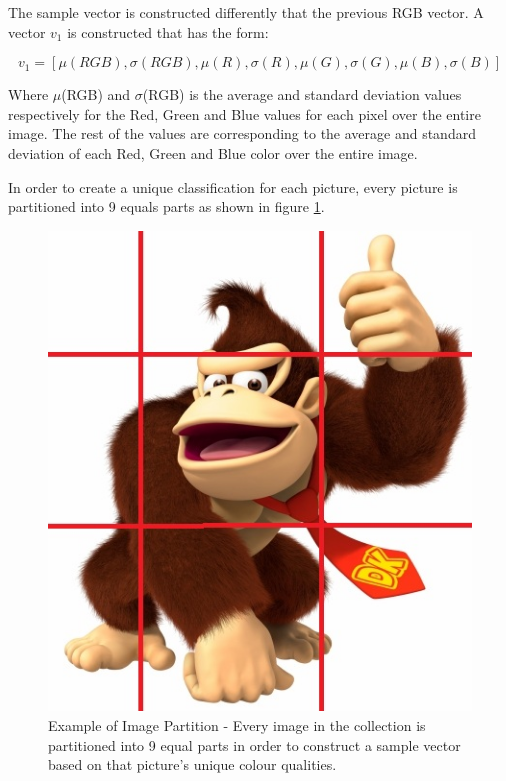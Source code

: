 \documentclass{IEEEtran}
\begin{document}
 The sample vector is constructed differently that the previous RGB vector. A vector $v_{1}$ is constructed that has the form: 

 
\begin{equation}
v_{1} = [\mu(RGB),\sigma(RGB),\mu(R),\sigma(R),\mu(G),\sigma(G),\mu(B),\sigma(B)]
\end{equation}


Where $\mu$(RGB) and $\sigma$(RGB) is the average and standard deviation values respectively for the Red, Green and Blue values for each pixel over the entire image. The rest of the values are corresponding to the average and standard deviation of each Red, Green and Blue color over the entire image.

In order to create a unique classification for each picture, every picture is partitioned into 9 equals parts as shown in figure \ref{fig:dkpartition}.
 
 
\begin{figure}[!htbp]
\centering
\includegraphics[scale=0.25]{./images/donkeykong_partition.jpg}
	\caption{Example of Image Partition - Every image in the collection is partitioned into 9 equal parts in order to construct a sample vector based on that picture's unique colour qualities.}
\label{fig:dkpartition} 
\end{figure}
\end{document}
